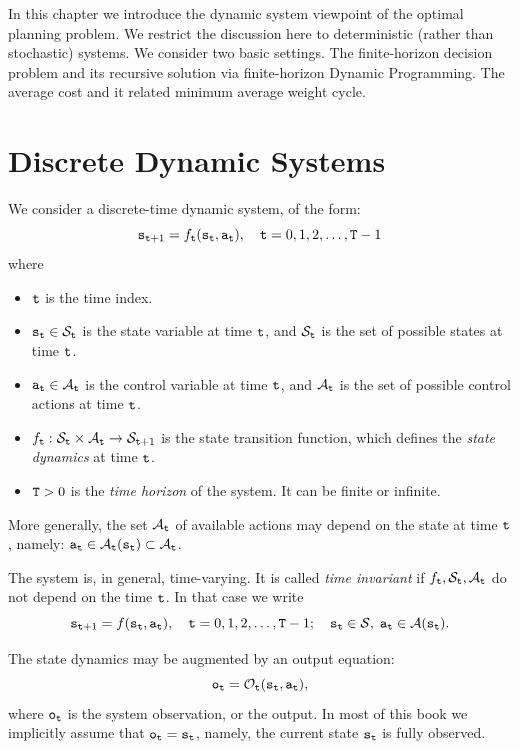 

In this chapter we introduce the dynamic system viewpoint of the
optimal planning problem. We restrict the discussion here to
deterministic (rather than stochastic) systems. We consider two
basic settings. The finite-horizon decision problem and its
recursive solution via finite-horizon Dynamic Programming. The
average cost and it related minimum average weight cycle.

\section{Discrete Dynamic Systems}
We consider a discrete-time dynamic system, of the form:
\[{{\tt s}_{{\tt t} + 1}} = {f_{{\tt t}}}({{\tt s}_{{\tt t}}},{{\tt a}_{{\tt t}}}),\quad {\tt t} = 0,1,2, \ldots ,{\tt T} - 1\]
where
\begin{itemize}
  \item ${\tt t}$ is the time index.
  \item ${{\tt s}_{{\tt t}}} \in {\mathcal{S}_{{\tt t}}}$ is the state variable at time ${\tt t}$, and $\mathcal{S}_{{\tt t}}$ is the set of possible states at time
  ${\tt t}$.
  \item ${{\tt a}_{{\tt t}}} \in {\mathcal{A}_{{\tt t}}}$  is the control variable at time ${\tt t}$, and $\mathcal{A}_{{\tt t}}$ is the set of possible control actions at time
  ${\tt t}$.
  \item ${f_{{\tt t}}}:{\mathcal{S}_{{\tt t}}} \times {\mathcal{A}_{{\tt t}}} \to {\mathcal{S}_{{\tt t}+ 1}}$ is the state transition function, which defines the \emph{state dynamics} at time
  ${\tt t}$.
  \item ${\tt T}>0$ is the \emph{time horizon} of the system.  It can be finite or infinite.
\end{itemize}

\begin{remark}
    More generally, the set $\mathcal{A}_{{\tt t}}$ of available actions may depend on the state at time ${\tt t}$, namely: ${\tt a}_{{\tt t}} \in {\mathcal{A}_{{\tt t}}}({{\tt s}_{{\tt t}}}) \subset
    {\mathcal{A}_{{\tt t}}}$.
\end{remark}
\begin{remark}
The system is, in general, time-varying. It is called \emph{time
invariant} if ${f_{{\tt t}}},{\mathcal{S}_{{\tt t}}},{\mathcal{A}_{{\tt t}}}$
do not depend on the time ${\tt t}$. In that case we
    write
\[{{\tt s}_{{\tt t} + 1}} = f({{\tt s}_{{\tt t}}},{{\tt a}_{{\tt t}}}),\quad {\tt t} = 0,1,2, \ldots ,{\tt T} - 1;\quad {{\tt s}_{{\tt t}}} \in \mathcal{S},\;{{\tt a}_{{\tt t}}} \in
\mathcal{A}({{\tt s}_{{\tt t}}}).\]
\end{remark}
\begin{remark}
    The state dynamics may be augmented by an output equation:
\[{{\tt o}_{{\tt t}}} = {\mathcal{O}_{{\tt t}}}({{\tt s}_{{\tt t}}},{{\tt a}_{{\tt t}}}),\]
where  ${\tt o}_{{\tt t}}$ is the system observation, or the
output. In most of this book we  implicitly assume that
${\tt o}_{{\tt t}}={\tt s}_{{\tt t}}$, namely, the current state
${\tt s}_{{\tt t}}$ is fully observed.
\end{remark}

